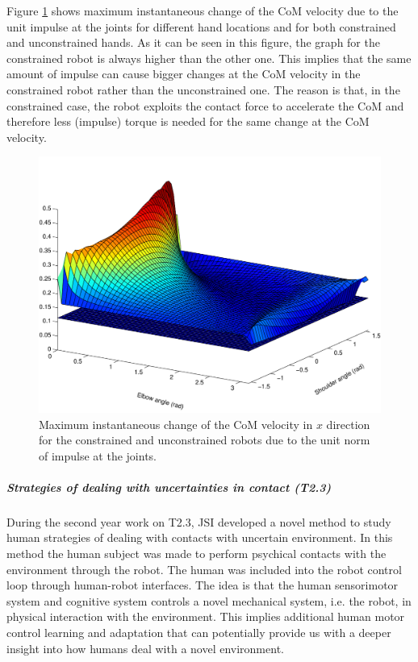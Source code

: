 Figure \ref{type3} shows maximum instantaneous change of the CoM velocity due
to the unit impulse at the joints for different hand locations and for both
constrained and unconstrained hands. As it can be seen in this figure, the
graph for the constrained robot is always higher than the other one. This
implies that the same amount of impulse can cause bigger changes at the CoM
velocity in the constrained robot rather than the unconstrained one. The
reason is that, in the constrained case, the robot exploits the contact force
to accelerate the CoM and therefore less (impulse) torque is needed for the
same change at the CoM velocity.
\begin{figure}[!t]
  \centering
  \includegraphics[width=\linewidth]{images/type3.pdf}
  \caption{Maximum instantaneous change of the CoM velocity in $x$ direction
    for the constrained and unconstrained robots due to the unit norm of
    impulse at the joints.}
  \label{type3}
\end{figure}







\subparagraph{Strategies of dealing with uncertainties in contact (T2.3)}

During the second year work on T2.3, JSI developed a novel method to study human strategies of dealing with contacts with uncertain environment. In this method the human subject was made to perform psychical contacts with the environment through the robot. The human was included into the robot control loop through human-robot interfaces. The idea is that the human sensorimotor system and cognitive system controls a novel mechanical system, i.e. the robot, in physical interaction with the environment. This implies additional human motor control learning and adaptation that can potentially provide us with a deeper insight into how humans deal with a novel environment.

